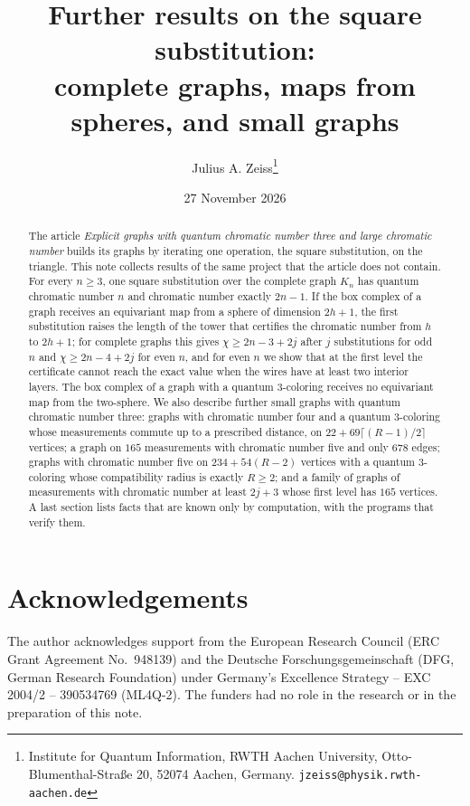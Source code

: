 \documentclass[a4paper,11pt]{article}
\title{Further results on the square substitution:\\ complete graphs, maps from spheres, and small graphs}
\author{Julius A. Zeiss\thanks{Institute for Quantum Information, RWTH Aachen University, Otto-Blumenthal-Stra\ss e 20, 52074 Aachen, Germany. \texttt{jzeiss@physik.rwth-aachen.de}}}
\date{27 November 2026}
\theoremstyle{definition}
\numberwithin{equation}{section}
\begin{document}
\maketitle

\begin{abstract}
The article \emph{Explicit graphs with quantum chromatic number three and large chromatic number} builds its graphs by iterating one operation, the square substitution, on the triangle. This note collects results of the same project that the article does not contain. For every $n\ge3$, one square substitution over the complete graph $K_n$ has quantum chromatic number $n$ and chromatic number exactly $2n-1$. If the box complex of a graph receives an equivariant map from a sphere of dimension $2h+1$, the first substitution raises the length of the tower that certifies the chromatic number from $h$ to $2h+1$; for complete graphs this gives $\chi\ge2n-3+2j$ after $j$ substitutions for odd $n$ and $\chi\ge2n-4+2j$ for even $n$, and for even $n$ we show that at the first level the certificate cannot reach the exact value when the wires have at least two interior layers. The box complex of a graph with a quantum $3$-coloring receives no equivariant map from the two-sphere. We also describe further small graphs with quantum chromatic number three: graphs with chromatic number four and a quantum $3$-coloring whose measurements commute up to a prescribed distance, on $22+69\lceil(R-1)/2\rceil$ vertices; a graph on $165$ measurements with chromatic number five and only $678$ edges; graphs with chromatic number five on $234+54(R-2)$ vertices with a quantum $3$-coloring whose compatibility radius is exactly $R\ge2$; and a family of graphs of measurements with chromatic number at least $2j+3$ whose first level has $165$ vertices. A last section lists facts that are known only by computation, with the programs that verify them.
\end{abstract}








\section*{Acknowledgements}
The author acknowledges support from the European Research Council (ERC Grant Agreement No.~948139) and the Deutsche Forschungsgemeinschaft (DFG, German Research Foundation) under Germany's Excellence Strategy -- EXC 2004/2 -- 390534769 (ML4Q-2). The funders had no role in the research or in the preparation of this note.
\end{document}
